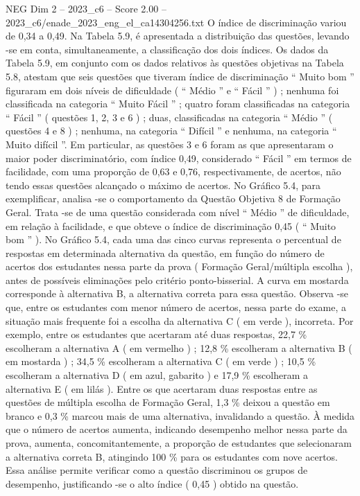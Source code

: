 \begin{textsample}{NEG Dim 2 – 2023\_c6 – Score 2.00 – 2023\_c6/enade\_2023\_eng\_el\_ca14304256.txt}
O índice de discriminação variou de 0,34 a 0,49.
Na Tabela 5.9, é apresentada a distribuição das questões, levando -se em conta, simultaneamente, a classificação dos dois índices.
Os dados da Tabela 5.9, em conjunto com os dados relativos às questões objetivas na Tabela 5.8, atestam que seis questões que tiveram índice de discriminação “ Muito bom ” figuraram em dois níveis de dificuldade ( “ Médio ” e “ Fácil ” ) ; nenhuma foi classificada na categoria “ Muito Fácil ” ; quatro foram classificadas na categoria “ Fácil ” ( questões 1, 2, 3 e 6 ) ; duas, classificadas na categoria “ Médio ” ( questões 4 e 8 ) ; nenhuma, na categoria “ Difícil ” e nenhuma, na categoria “ Muito difícil ”.
Em particular, as questões 3 e 6 foram as que apresentaram o maior poder discriminatório, com índice 0,49, considerado “ Fácil ” em termos de facilidade, com uma proporção de 0,63 e 0,76, respectivamente, de acertos, não tendo essas questões alcançado o máximo de acertos.
No Gráfico 5.4, para exemplificar, analisa -se o comportamento da Questão Objetiva 8 de Formação Geral.
Trata -se de uma questão considerada com nível “ Médio ” de dificuldade, em relação à facilidade, e que obteve o índice de discriminação 0,45 ( “ Muito bom ” ).
No Gráfico 5.4, cada uma das cinco curvas representa o percentual de respostas em determinada alternativa da questão, em função do número de acertos dos estudantes nessa parte da prova ( Formação Geral/múltipla escolha ), antes de possíveis eliminações pelo critério ponto-bisserial.
A curva em mostarda corresponde à alternativa B, a alternativa correta para essa questão.
Observa -se que, entre os estudantes com menor número de acertos, nessa parte do exame, a situação mais frequente foi a escolha da alternativa C ( em verde ), incorreta.
Por exemplo, entre os estudantes que acertaram até duas respostas, 22,7 \% escolheram a alternativa A ( em vermelho ) ; 12,8 \% escolheram a alternativa B ( em mostarda ) ; 34,5 \% escolheram a alternativa C ( em verde ) ; 10,5 \% escolheram a alternativa D ( em azul, gabarito ) e 17,9 \% escolheram a alternativa E ( em lilás ).
Entre os que acertaram duas respostas entre as questões de múltipla escolha de Formação Geral, 1,3 \% deixou a questão em branco e 0,3 \% marcou mais de uma alternativa, invalidando a questão.
À medida que o número de acertos aumenta, indicando desempenho melhor nessa parte da prova, aumenta, concomitantemente, a proporção de estudantes que selecionaram a alternativa correta B, atingindo 100 \% para os estudantes com nove acertos.
Essa análise permite verificar como a questão discriminou os grupos de desempenho, justificando -se o alto índice ( 0,45 ) obtido na questão.

\end{textsample}
